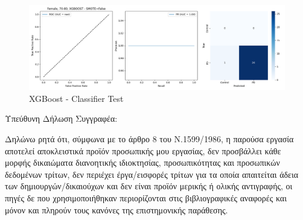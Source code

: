 \documentclass[12pt]{report}
\begin{document}
                \begin{figure}[H]
                    \centering
                    \includegraphics[width=1\textwidth]{ML/Predict/DEG/AUC/results_stratified_Female_70-80_XGBOOST_useSMOTE_False.png}
                    \caption*{XGBoost - Classifier Test}
                    \label{fig:app_xgb_females_70_80_test}
                \end{figure}
                    
                
              
    \printbibliography
    \newpage
    
    \vspace*{\fill}
    \scriptsize
    Υπεύθυνη Δήλωση Συγγραφέα:

    Δηλώνω ρητά ότι, σύμφωνα με το άρθρο 8 του Ν.1599/1986, η παρούσα εργασία αποτελεί αποκλειστικά προϊόν προσωπικής μου εργασίας, δεν προσβάλλει κάθε μορφής δικαιώματα διανοητικής ιδιοκτησίας, προσωπικότητας και προσωπικών δεδομένων τρίτων, δεν περιέχει έργα/εισφορές τρίτων για τα οποία απαιτείται άδεια των δημιουργών/δικαιούχων και δεν είναι προϊόν μερικής ή ολικής αντιγραφής, οι πηγές δε που χρησιμοποιήθηκαν περιορίζονται στις βιβλιογραφικές αναφορές και μόνον και πληρούν τους κανόνες της επιστημονικής παράθεσης.
\end{document}

